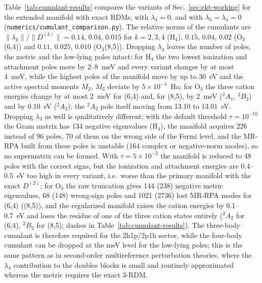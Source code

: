 \documentclass[aip,jcp,reprint,noshowkeys,superscriptaddress]{revtex4-1}
\begin{document}
Table~\ref{tab:cumulant-results} compares the variants of
Sec.~\ref{sec:ekt-working} for the extended manifold with exact RDMs,
with $\lambda_4=0$, and with $\lambda_3=\lambda_4=0$
(\texttt{numerics/cumulant\_comparison.py}).  The relative norms of the
cumulants are $\|\lambda_k\|/\|D^{(k)}\|=0.14$, $0.04$, $0.015$ for
$k=2,3,4$ (H$_4$), $0.15$, $0.04$, $0.02$ (O$_3$(6,4)) and $0.11$, $0.025$, $0.010$ (O$_3$(8,5)).  Dropping $\lambda_4$ leaves the number of
poles, the metric and the low-lying poles intact: for H$_4$ the two lowest
ionization and attachment poles move by 2--8~meV and every variant
changes by at most 4~meV, while the highest poles of the manifold move by
up to 30~eV and the active spectral moments $M_2$, $M_3$ deviate by
$5\times10^{-4}$~Ha; for O$_3$ the three cation energies change by at most 2~meV for (6,4) and, for (8,5), by 2~meV ($^2A_1$, $^2B_2$) and by 0.10~eV ($^2A_2$), the $^2A_2$ pole itself moving from 13.10 to 13.01~eV.  Dropping $\lambda_3$ as well is
qualitatively different: with the default threshold $\tau=10^{-10}$ the
Gram matrix has 134 negative eigenvalues (H$_4$), the manifold acquires
226 instead of 96 poles, 70 of them on the wrong side of the Fermi level,
and the MR-RPA built from these poles is unstable (164 complex or
negative-norm modes), so no supermatrix can be formed.  With
$\tau=5\times10^{-2}$ the manifold is reduced to 48 poles with the
correct signs, but the ionization and attachment energies are
0.4--0.5~eV too high in every variant, i.e.\ worse than the primary
manifold with the exact $D^{(2)}$; for O$_3$ the raw truncation gives 144 (238) negative metric eigenvalues, 68 (148) wrong-sign poles and 1021 (2736) lost MR-RPA modes for (6,4) ((8,5)), and the regularized manifold raises the cation energies by 0.1--0.7~eV and loses the residue of one of the three cation states entirely ($^2A_2$ for (6,4), $^2B_2$ for (8,5); dashes in Table~\ref{tab:cumulant-results}).  The three-body cumulant is
therefore required for the 2h1p/2p1h sector, while the four-body cumulant
can be dropped at the meV level for the low-lying poles; this is the same
pattern as in second-order multireference perturbation theories, where
the $\lambda_4$ contribution to the doubles blocks is small and routinely
approximated whereas the metric requires the exact 3-RDM.
\end{document}
